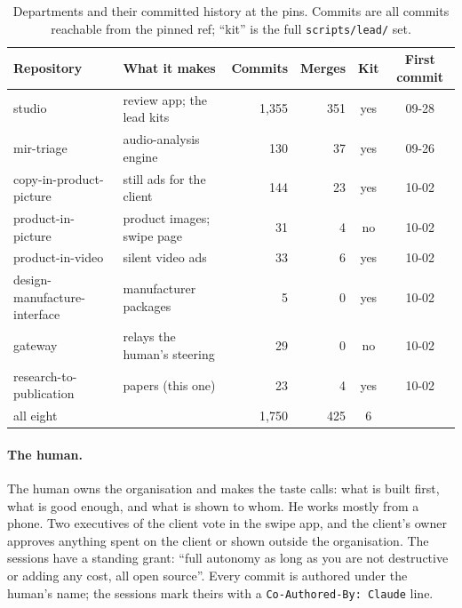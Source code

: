 \documentclass[11pt]{article}
\newcommand{\code}[1]{\texttt{#1}}
\begin{document}
\begin{table}[t]
\centering
\small
\caption{Departments and their committed history at the pins. Commits are all commits
reachable from the pinned ref; ``kit'' is the full \code{scripts/lead/} set.}
\label{tab:depts}
\begin{tabularx}{\linewidth}{@{}lYrrcc@{}}
\toprule
Repository & What it makes & Commits & Merges & Kit & First commit \\
\midrule
studio & review app; the lead kits & 1,355 & 351 & yes & 09-28 \\ %
mir-triage & audio-analysis engine & 130 & 37 & yes & 09-26 \\ %
copy-in-product-picture & still ads for the client & 144 & 23 & yes & 10-02 \\ %
product-in-picture & product images; swipe page & 31 & 4 & no & 10-02 \\ %
product-in-video & silent video ads & 33 & 6 & yes & 10-02 \\ %
design-manufacture-interface & manufacturer packages & 5 & 0 & yes & 10-02 \\ %
gateway & relays the human's steering & 29 & 0 & no & 10-02 \\ %
research-to-publication & papers (this one) & 23 & 4 & yes & 10-02 \\ %
\midrule
all eight & & 1,750 & 425 & 6 & \\ %
\bottomrule
\end{tabularx}
\end{table}

\paragraph{The human.}
The human owns the organisation and makes the taste calls: what is built first, what is
good enough, and what is shown to whom. He works mostly from a phone. Two executives of
the client vote in the swipe app, and the client's owner approves anything spent on the
client or shown outside the organisation. The sessions have a standing grant: ``full %
autonomy as long as you are not destructive or adding any cost, all open source''. Every
commit is authored under the human's name; the sessions mark theirs with a %
\code{Co-Authored-By: Claude} line.
\end{document}
